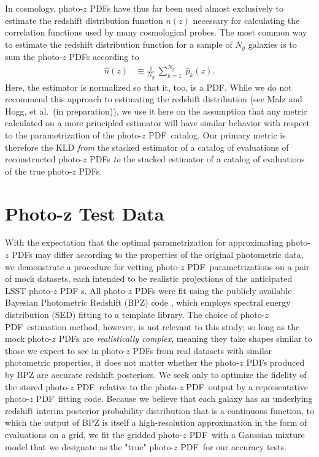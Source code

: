 \documentclass[\docopts]{\docclass}
\newcommand{\pz}{photo-$z$ PDF}
\begin{document}
In cosmology, \pz s have thus far been used almost exclusively to estimate the 
redshift distribution function $n(z)$ necessary for calculating the correlation 
functions used by many cosmological probes.
The most common way to estimate the redshift distribution function for a sample 
of $N_{g}$ galaxies is to sum the \pz s according to
\begin{align}
  \label{eq:nz}
  \hat{n}(z) &\equiv \frac{1}{N_{g}}\ \sum_{k=1}^{N_{g}}\ \hat{p}_{k}(z).
\end{align}
Here, the estimator is normalized so that it, too, is a PDF.
While we do not recommend this approach to estimating the redshift distribution 
(see Malz and Hogg, et al.\ (in preparation)), we use it here on the assumption 
that any metric calculated on a more principled estimator will have similar 
behavior with respect to the parametrization of the \pz\ catalog.
Our primary metric is therefore the KLD \textit{from} the stacked estimator of 
a catalog of evaluations of reconstructed \pz s \textit{to} the stacked 
estimator of a catalog of evaluations of the true \pz s.


\section{Photo-z Test Data}
\label{sec:data}

With the expectation that the optimal parametrization for approximating \pz s 
may differ according to the properties of the original photometric data, we 
demonstrate a procedure for vetting \pz\ parametrizations on a pair of mock 
datasets, each intended to be realistic projections of the anticipated LSST \pz 
s.
All \pz s were fit using the publicly available Bayesian Photometric Redshift 
(BPZ) code \citep{benitez_bayesian_2000}, which employs spectral energy 
distribution (SED) fitting to a template library.
The choice of \pz\ estimation method, however, is not relevant to this study; 
so long as the mock \pz s are \textit{realistically complex}, meaning they take 
shapes similar to those we expect to see in \pz s from real datasets with 
similar photometric properties, it does not matter whether the \pz s produced 
by BPZ are accurate redshift posteriors.
We seek only to optimize the fidelity of the stored \pz\ relative to the \pz\ 
output by a representative \pz\ fitting code.
\citep[See][Schmidt, et al.\ in preparation for other work comparing the 
accuracy of \pz s produced by different methods.]{tanaka_photometric_2017}
Because we believe that each galaxy has an underlying redshift interim 
posterior probability distribution that is a continuous function, to which the 
output of BPZ is itself a high-resolution approximation in the form of 
evaluations on a grid, we fit the gridded \pz\ with a Gaussian mixture model 
that we designate as the "true" \pz\ for our accuracy tests.
\end{document}
